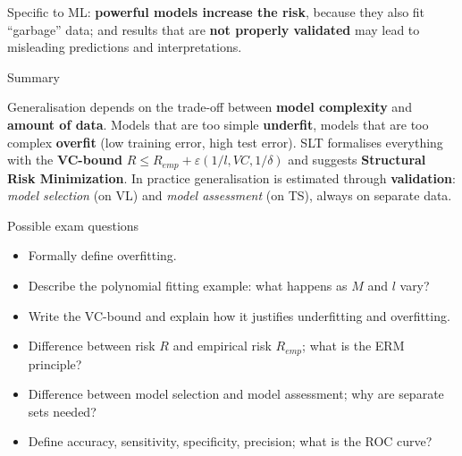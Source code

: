 Specific to ML: \textbf{powerful models increase the risk}, because
they also fit ``garbage'' data; and results that are \textbf{not
properly validated} may lead to misleading predictions and
interpretations.

\begin{boxabstract}{Summary}

Generalisation depends on the trade-off between \textbf{model
complexity} and \textbf{amount of data}. Models that are too simple
\textbf{underfit}, models that are too complex \textbf{overfit} (low
training error, high test error). SLT formalises everything with the
\textbf{VC-bound} \(R \le R_{emp} + \varepsilon(1/l, VC, 1/\delta)\)
and suggests \textbf{Structural Risk Minimization}. In practice
generalisation is estimated through \textbf{validation}: \emph{model
selection} (on VL) and \emph{model assessment} (on TS), always on
separate data.

\end{boxabstract}

\begin{boxquestion}{Possible exam questions}

\begin{itemize}
\tightlist
\item
  Formally define overfitting.
\item
  Describe the polynomial fitting example: what happens as \(M\) and
  \(l\) vary?
\item
  Write the VC-bound and explain how it justifies underfitting and
  overfitting.
\item
  Difference between risk \(R\) and empirical risk \(R_{emp}\); what
  is the ERM principle?
\item
  Difference between model selection and model assessment; why are
  separate sets needed?
\item
  Define accuracy, sensitivity, specificity, precision; what is the ROC
  curve?
\end{itemize}

\end{boxquestion}
